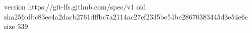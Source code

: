 version https://git-lfs.github.com/spec/v1
oid sha256:dbc83ec4a2dacb2761dffbc7a2114ac27ef2335be54be28670383445d3e54e6c
size 339
